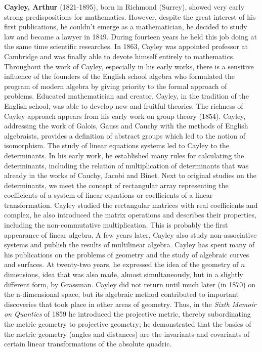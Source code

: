 \textbf{Cayley, Arthur} (1821-1895), born in Richmond (Surrey), showed very early strong predispositions for mathematics. However, despite the great interest of his first publications, he couldn't emerge as a mathematician, he decided to study law and became a lawyer in 1849. During fourteen years he held this job doing at the same time scientific researches. In 1863, Cayley was appointed professor at Cambridge and was finally able to devote himself entirely to mathematics. Throughout the work of Cayley, especially in his early works, there is a sensitive influence of the founders of the English school algebra who formulated the program of modern algebra by giving priority to the formal approach of problems. Educated mathematician and creator, Cayley, in the tradition of the English school, was able to develop new and fruitful theories. The richness of Cayley approach appears from his early work on group theory (1854). Cayley, addressing the work of Galois, Gauss and Cauchy with the methods of English algebraists, provides a definition of abstract groups which led to the notion of isomorphism. The study of linear equations systems led to Cayley to the determinants. In his early work, he established many rules for calculating the determinants, including the relation of multiplication of determinants that was already in the works of Cauchy, Jacobi and Binet. Next to original studies on the determinants, we meet the concept of rectangular array representing the coefficients of a system of linear equations or coefficients of a linear transformation. Cayley studied the rectangular matrices with real coefficients and complex, he also introduced the matrix operations and describes their properties, including the non-commutative multiplication. This is probably the first appearance of linear algebra. A few years later, Cayley also study non-associative systems and publish the results of multilinear algebra. Cayley has spent many of his publications on the problems of geometry and the study of algebraic curves and surfaces. At twenty-two years, he expressed the idea of the geometry of $n$ dimensions, idea that was also made, almost simultaneously, but in a slightly different form, by Grassman. Cayley did not return until much later (in 1870) on the n-dimensional space, but its algebraic method contributed to important discoveries that took place in other areas of geometry. Thus, in the \textit{Sixth Memoir on Quantics} of 1859 he introduced the projective metric, thereby subordinating the metric geometry to projective geometry; he demonstrated that the basics of the metric geometry (angles and distances) are the invariants and covariants of certain linear transformations of the absolute quadric.

